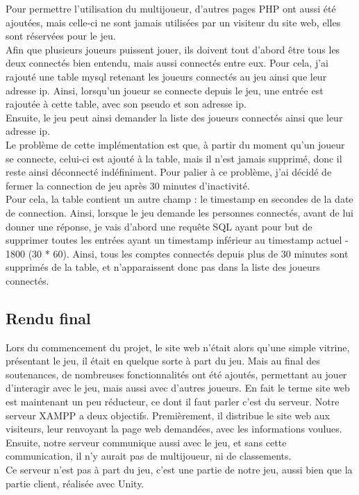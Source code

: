 \documentclass[12pt]{article}
\begin{document}
Pour permettre l'utilisation du multijoueur, d'autres pages PHP ont aussi été ajoutées, mais celle-ci ne sont jamais utilisées par un visiteur du site web, elles sont réservées pour le jeu.\\
Afin que plusieurs joueurs puissent jouer,  ils doivent tout d'abord être tous les deux connectés bien entendu, mais aussi connectés entre eux. Pour cela, j'ai rajouté une table mysql retenant les joueurs connectés au jeu ainsi que leur adresse ip. Ainsi, lorsqu'un joueur se connecte depuis le jeu, une entrée est rajoutée à cette table, avec son pseudo et son adresse ip.\\
Ensuite, le jeu peut ainsi demander la liste des joueurs connectés ainsi que leur adresse ip.\\
Le problème de cette implémentation est que, à partir du moment qu'un joueur se connecte, celui-ci est ajouté à la table, mais il n'est jamais supprimé, donc il reste ainsi déconnecté indéfiniment. Pour palier à ce problème, j'ai décidé de fermer la connection de jeu après 30 minutes d'inactivité.\\
Pour cela, la table contient un autre champ : le timestamp en secondes de la date de connection. Ainsi, lorsque le jeu demande les personnes connectés, avant de lui donner une réponse, je vais d'abord une requête SQL ayant pour but de supprimer toutes les entrées ayant un timestamp inférieur au timestamp actuel - 1800 (30 * 60). Ainsi, tous les comptes connectés depuis plus de 30 minutes sont supprimés de la table, et n'apparaissent donc pas dans la liste des joueurs connectés.

\subsection{Rendu final}

Lors du commencement du projet, le site web n'était alors qu'une simple vitrine, présentant le jeu, il était en quelque sorte à part du jeu. Mais au final des soutenances, de nombreuses fonctionnalités ont été ajoutés, permettant au jouer d'interagir avec le jeu, mais aussi avec d'autres joueurs. En fait le terme site web est maintenant un peu réducteur, ce dont il faut parler c'est du serveur. Notre serveur XAMPP a deux objectifs. Premièrement, il distribue le site web aux visiteurs, leur renvoyant la page web demandées, avec les informations voulues.\\
Ensuite, notre serveur communique aussi avec le jeu, et sans cette communication, il n'y aurait pas de multijoueur, ni de classements.\\
Ce serveur n'est pas à part du jeu, c'est une partie de notre jeu, aussi bien que la partie client, réalisée avec Unity.\\
\end{document}

